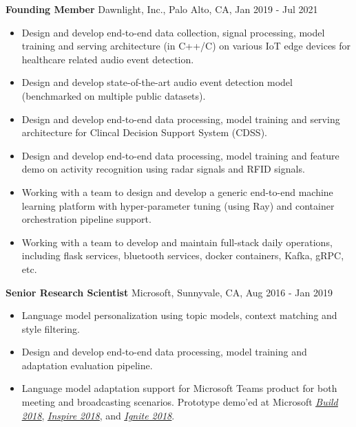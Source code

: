 {\bf Founding Member} \hfill Dawnlight, Inc., Palo Alto, CA, Jan 2019 - Jul 2021
\begin{itemize}
\item Design and develop end-to-end data collection, signal processing, model training and serving architecture (in C++/C) on various IoT edge devices for healthcare related audio event detection.
\item Design and develop state-of-the-art audio event detection model (benchmarked on multiple public datasets).
\item Design and develop end-to-end data processing, model training and serving architecture for Clincal Decision Support System (CDSS).
\item Design and develop end-to-end data processing, model training and feature demo on activity recognition using radar signals and RFID signals.
\item Working with a team to design and develop a generic end-to-end machine learning platform with hyper-parameter tuning (using Ray) and container orchestration pipeline support.
\item Working with a team to develop and maintain full-stack daily operations, including flask services, bluetooth services, docker containers, Kafka, gRPC, etc.
\end{itemize}

{\bf Senior Research Scientist} \hfill Microsoft, Sunnyvale, CA, Aug 2016 - Jan 2019
\begin{itemize}
\item Language model personalization using topic models, context matching and style filtering.
\item Design and develop end-to-end data processing, model training and adaptation evaluation pipeline.
\item Language model adaptation support for Microsoft Teams product for both meeting and broadcasting scenarios. Prototype demo'ed at Microsoft \href{https://medius.studios.ms/Embed/Video/BRK2403?sid=BRK2403}{\emph{\underline{Build 2018}}}, \href{https://myinspire.microsoft.com/videos/87f6a740-cf4c-4f45-a405-f62f1a28740a}{\emph{\underline{Inspire 2018}}}, and \href{https://myignite.techcommunity.microsoft.com/sessions/66676}{\emph{\underline{Ignite 2018}}}.
\end{itemize}

